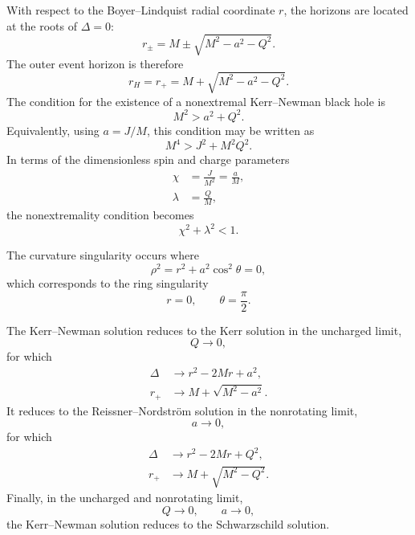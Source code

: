 With respect to the Boyer--Lindquist radial coordinate \(r\), the horizons are located at the roots of \(\Delta=0\):
\begin{equation}
r_{\pm}
=
M \pm \sqrt{M^2-a^2-Q^2}.
\end{equation}
The outer event horizon is therefore
\begin{equation}
r_H = r_+ = M+\sqrt{M^2-a^2-Q^2}.
\end{equation}
The condition for the existence of a nonextremal Kerr--Newman black hole is
\begin{equation}
M^2 > a^2 + Q^2 .
\end{equation}
Equivalently, using \(a=J/M\), this condition may be written as
\begin{equation}
M^4 > J^2 + M^2 Q^2 .
\end{equation}
In terms of the dimensionless spin and charge parameters
\begin{align}
\chi &= \frac{J}{M^2} = \frac{a}{M}, \\
\lambda &= \frac{Q}{M},
\end{align}
the nonextremality condition becomes
\begin{equation}
\chi^2+\lambda^2 < 1 .
\end{equation}

The curvature singularity occurs where
\begin{equation}
\rho^2 = r^2+a^2\cos^2\theta = 0,
\end{equation}
which corresponds to the ring singularity
\begin{equation}
r=0,
\qquad
\theta=\frac{\pi}{2}.
\end{equation}

The Kerr--Newman solution reduces to the Kerr solution in the uncharged limit,
\begin{equation}
Q \to 0,
\end{equation}
for which
\begin{align}
\Delta &\to r^2-2Mr+a^2, \\
r_+ &\to M+\sqrt{M^2-a^2}.
\end{align}
It reduces to the Reissner--Nordstr\"om solution in the nonrotating limit,
\begin{equation}
a \to 0,
\end{equation}
for which
\begin{align}
\Delta &\to r^2-2Mr+Q^2, \\
r_+ &\to M+\sqrt{M^2-Q^2}.
\end{align}
Finally, in the uncharged and nonrotating limit,
\begin{equation}
Q \to 0,
\qquad
a \to 0,
\end{equation}
the Kerr--Newman solution reduces to the Schwarzschild solution.

